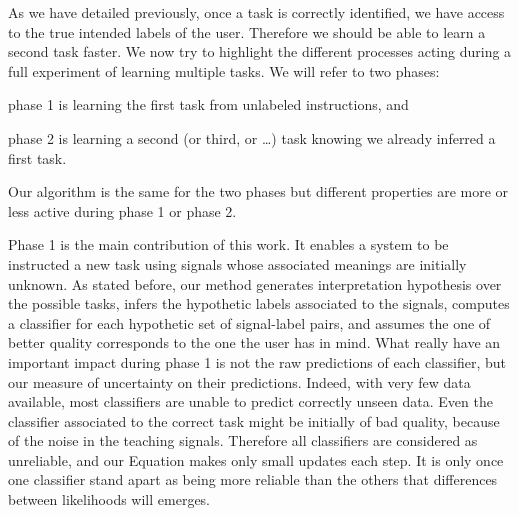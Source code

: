 
As we have detailed previously, once a task is correctly identified, we have access to the true intended labels of the user. Therefore we should be able to learn a second task faster. We now try to highlight the different processes acting during a full experiment of learning multiple tasks. We will refer to two phases: \begin{inparaenum}[a)] \item phase 1 is learning the first task from unlabeled instructions, and \item phase 2 is learning a second (or third, or \ldots) task knowing we already inferred a first task. \end{inparaenum} Our algorithm is the same for the two phases but different properties are more or less active during phase 1 or phase 2.

Phase 1 is the main contribution of this work. It enables a system to be instructed a new task using signals whose associated meanings are initially unknown. As stated before, our method generates interpretation hypothesis over the possible tasks, infers the hypothetic labels associated to the signals, computes a classifier for each hypothetic set of signal-label pairs, and assumes the one of better quality corresponds to the one the user has in mind. What really have an important impact during phase 1 is not the raw predictions of each classifier, but our measure of uncertainty on their predictions. Indeed, with very few data available, most classifiers are unable to predict correctly unseen data. Even the classifier associated to the correct task might be initially of bad quality, because of the noise in the teaching signals. Therefore all classifiers are considered as unreliable, and our Equation makes only small updates each step. It is only once one classifier stand apart as being more reliable than the others that differences between likelihoods will emerges.


